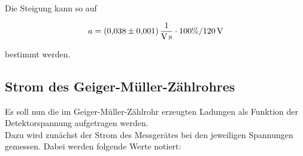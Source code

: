 \noindent Die Steigung kann so auf 

\begin{align*}
    a = \qty{0.038\pm0.001}{\per \volt \per \second} \cdot 100\% / \qty{120}{\volt}
\end{align*}

\noindent bestimmt werden. 


\subsection{Strom des Geiger-Müller-Zählrohres}
\noindent Es soll nun die im Geiger-Müller-Zählrohr erzeugten Ladungen als Funktion der Detektorspannung aufgetragen werden. \\ 
\noindent Dazu wird zunächst der Strom des Messgerätes bei den jeweiligen Spannungen gemessen. Dabei werden folgende Werte notiert:

